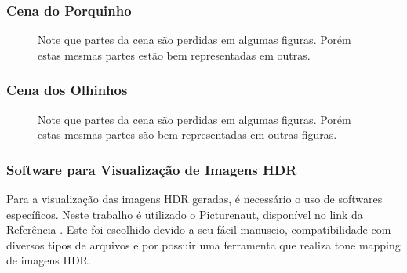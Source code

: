 \subsubsection{Cena do Porquinho} \label{cenaPorquinho}


\begin{figure}[H]
  \quad %
  \quad %
  \quad %
  \caption{Note que partes da cena são perdidas em algumas figuras. Porém estas mesmas partes estão bem representadas em outras.}
  \label{figBasePorquinho}
\end{figure}


\subsubsection{Cena dos Olhinhos} \label{cenaOlhinhos}

\begin{figure}[H]
  \quad %
  \quad %
  \quad %
  \quad %
  \caption{Note que partes da cena são perdidas em algumas figuras. Porém estas mesmas partes são bem representadas em outras figuras.}
  \label{figBaseOlhinhos}
\end{figure}

\subsubsection{Software para Visualização de Imagens HDR} \label{baseImgPicturenaut}

Para a visualização das imagens HDR geradas, é necessário o uso de softwares específicos. Neste trabalho é utilizado o Picturenaut, disponível no link da Referência \cite{picturenaut}. Este foi escolhido devido a seu fácil manuseio, compatibilidade com diversos tipos de arquivos e por possuir uma ferramenta que realiza tone mapping de imagens HDR.
